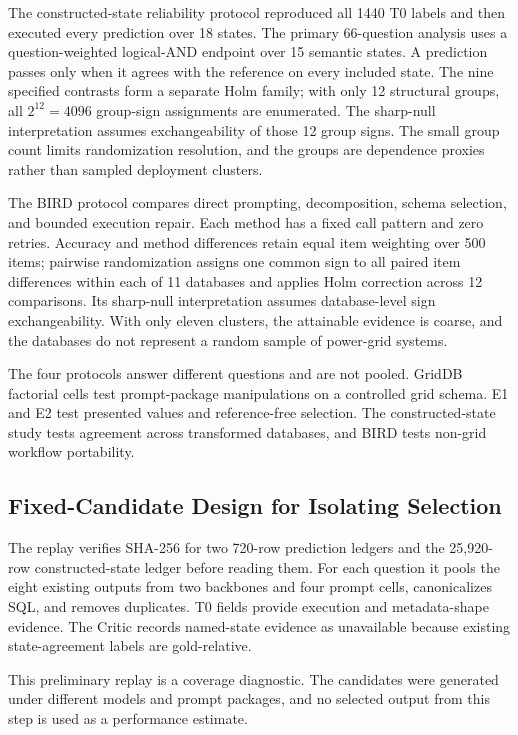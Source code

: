 \documentclass[information,article,submit,moreauthors]{Definitions/mdpi}
\begin{document}
The constructed-state reliability protocol reproduced all 1440 T0 labels and then executed every prediction over 18 states. The primary 66-question analysis uses a question-weighted logical-AND endpoint over 15 semantic states. A prediction passes only when it agrees with the reference on every included state. The nine specified contrasts form a separate Holm family; with only 12 structural groups, all $2^{12}=4096$ group-sign assignments are enumerated. The sharp-null interpretation assumes exchangeability of those 12 group signs. The small group count limits randomization resolution, and the groups are dependence proxies rather than sampled deployment clusters.

The BIRD protocol compares direct prompting, decomposition, schema selection, and bounded execution repair. Each method has a fixed call pattern and zero retries. Accuracy and method differences retain equal item weighting over 500 items; pairwise randomization assigns one common sign to all paired item differences within each of 11 databases and applies Holm correction across 12 comparisons. Its sharp-null interpretation assumes database-level sign exchangeability. With only eleven clusters, the attainable evidence is coarse, and the databases do not represent a random sample of power-grid systems.

The four protocols answer different questions and are not pooled. GridDB factorial cells test prompt-package manipulations on a controlled grid schema. E1 and E2 test presented values and reference-free selection. The constructed-state study tests agreement across transformed databases, and BIRD tests non-grid workflow portability.

\subsection{Fixed-Candidate Design for Isolating Selection}

The replay verifies SHA-256 for two 720-row prediction ledgers and the 25,920-row constructed-state ledger before reading them. For each question it pools the eight existing outputs from two backbones and four prompt cells, canonicalizes SQL, and removes duplicates. T0 fields provide execution and metadata-shape evidence. The Critic records named-state evidence as unavailable because existing state-agreement labels are gold-relative.

This preliminary replay is a coverage diagnostic. The candidates were generated under different models and prompt packages, and no selected output from this step is used as a performance estimate.
\end{document}
